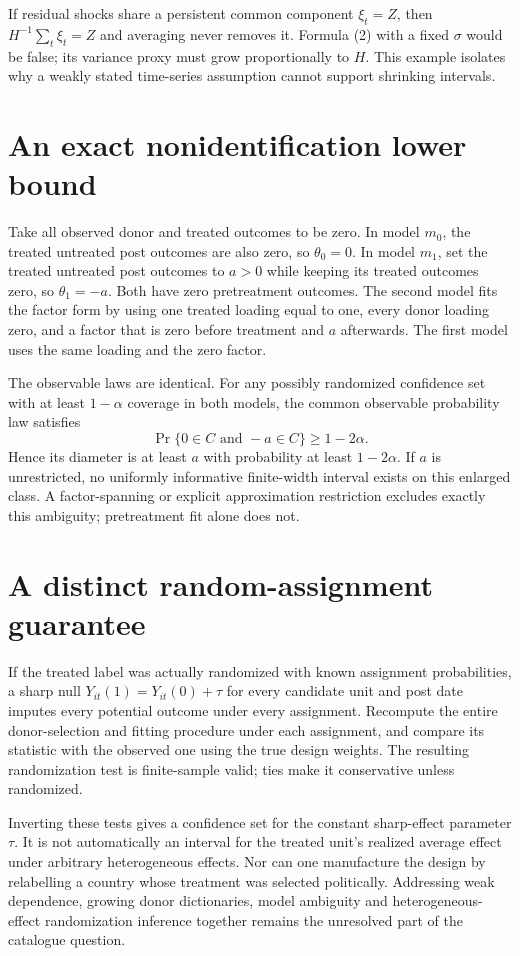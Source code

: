 \documentclass[11pt]{article}
\begin{document}
If residual shocks share a persistent common component $\xi_t=Z$, then $H^{-1}\sum_t\xi_t=Z$ and averaging never removes it. Formula (2) with a fixed $\sigma$ would be false; its variance proxy must grow proportionally to $H$. This example isolates why a weakly stated time-series assumption cannot support shrinking intervals.

\section*{An exact nonidentification lower bound}
Take all observed donor and treated outcomes to be zero. In model $m_0$, the treated untreated post outcomes are also zero, so $\theta_0=0$. In model $m_1$, set the treated untreated post outcomes to $a>0$ while keeping its treated outcomes zero, so $\theta_1=-a$. Both have zero pretreatment outcomes. The second model fits the factor form by using one treated loading equal to one, every donor loading zero, and a factor that is zero before treatment and $a$ afterwards. The first model uses the same loading and the zero factor.

The observable laws are identical. For any possibly randomized confidence set with at least $1-\alpha$ coverage in both models, the common observable probability law satisfies
\[
 \Pr\{0\in C\text{ and }-a\in C\}\geq1-2\alpha.
\]
Hence its diameter is at least $a$ with probability at least $1-2\alpha$. If $a$ is unrestricted, no uniformly informative finite-width interval exists on this enlarged class. A factor-spanning or explicit approximation restriction excludes exactly this ambiguity; pretreatment fit alone does not.

\section*{A distinct random-assignment guarantee}
If the treated label was actually randomized with known assignment probabilities, a sharp null $Y_{it}(1)=Y_{it}(0)+\tau$ for every candidate unit and post date imputes every potential outcome under every assignment. Recompute the entire donor-selection and fitting procedure under each assignment, and compare its statistic with the observed one using the true design weights. The resulting randomization test is finite-sample valid; ties make it conservative unless randomized.

Inverting these tests gives a confidence set for the constant sharp-effect parameter $\tau$. It is not automatically an interval for the treated unit's realized average effect under arbitrary heterogeneous effects. Nor can one manufacture the design by relabelling a country whose treatment was selected politically. Addressing weak dependence, growing donor dictionaries, model ambiguity and heterogeneous-effect randomization inference together remains the unresolved part of the catalogue question.
\end{document}
